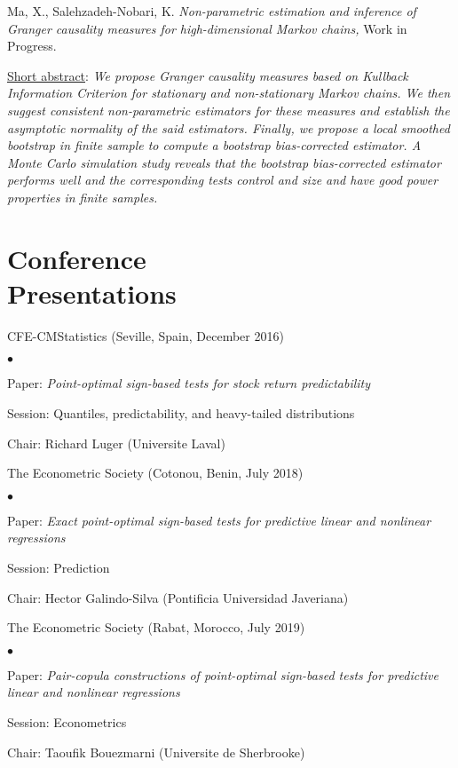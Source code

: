 \documentclass[margin,line,pifont,palatino,courier]{res}
\newenvironment{list2}{
  \begin{list}{$\bullet$}{%
      \setlength{\itemsep}{0in}
      \setlength{\parsep}{0in} \setlength{\parskip}{0in}
      \setlength{\topsep}{0in} \setlength{\partopsep}{0in}
      \setlength{\leftmargin}{0.2in}}}{\end{list}}
\begin{document}
\begin{resume}
\vspace{+4ex}
Ma, X., Salehzadeh-Nobari, K. \emph{Non-parametric estimation and inference of Granger causality measures for high-dimensional Markov chains,} Work in Progress.

\underline{Short abstract}: \emph{We propose Granger causality measures based on Kullback Information Criterion for stationary and non-stationary Markov chains. We then suggest consistent non-parametric estimators for these measures and establish the asymptotic normality of the said estimators. Finally, we propose a local smoothed bootstrap in finite sample to compute a bootstrap bias-corrected estimator. A Monte Carlo simulation study reveals that the bootstrap bias-corrected estimator performs well and the corresponding tests control and size and have good power properties in finite samples.}

\hrulefill

\section{\sc \textbf{Conference \\ Presentations}}
CFE-CMStatistics (Seville, Spain, December 2016)\\
\begin{list2}
\item Paper: \emph{Point-optimal sign-based tests for stock return predictability}
\item Session: Quantiles, predictability, and heavy-tailed distributions
\item Chair: Richard Luger (Universite Laval)
\end{list2}


The Econometric Society (Cotonou, Benin, July 2018)\\
\begin{list2}
\item Paper: \emph{Exact point-optimal sign-based tests for predictive linear and nonlinear regressions}
\item Session: Prediction
\item Chair: Hector Galindo-Silva (Pontificia Universidad Javeriana)
\end{list2}

The Econometric Society (Rabat, Morocco, July 2019)\\
\begin{list2}
\item Paper: \emph{Pair-copula constructions of point-optimal sign-based tests for predictive linear and nonlinear regressions}
\item Session: Econometrics
\item Chair: Taoufik Bouezmarni (Universite de Sherbrooke)
\end{list2} 


\end{resume}
\end{document}
